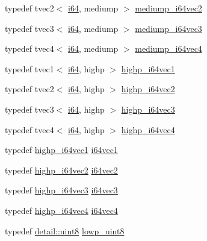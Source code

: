 \begin{DoxyCompactItemize}
\item 
typedef tvec2$<$ \hyperlink{group__gtc__type__precision_gac7a7eaad46064fc952b06df33689da23}{i64}, mediump $>$ \hyperlink{namespaceglm_ac9b4b83ee34df1f21f6dbfc5746e8177}{mediump\+\_\+i64vec2}
\item 
typedef tvec3$<$ \hyperlink{group__gtc__type__precision_gac7a7eaad46064fc952b06df33689da23}{i64}, mediump $>$ \hyperlink{namespaceglm_a19680633964fb57e619bdf1d01b21115}{mediump\+\_\+i64vec3}
\item 
typedef tvec4$<$ \hyperlink{group__gtc__type__precision_gac7a7eaad46064fc952b06df33689da23}{i64}, mediump $>$ \hyperlink{namespaceglm_acb96f56ac9a42f39ca90209cfd557a26}{mediump\+\_\+i64vec4}
\item 
typedef tvec1$<$ \hyperlink{group__gtc__type__precision_gac7a7eaad46064fc952b06df33689da23}{i64}, highp $>$ \hyperlink{namespaceglm_a2fefd6da904e77486fc57d4596eee3f4}{highp\+\_\+i64vec1}
\item 
typedef tvec2$<$ \hyperlink{group__gtc__type__precision_gac7a7eaad46064fc952b06df33689da23}{i64}, highp $>$ \hyperlink{namespaceglm_a8b9347c378dc3f977fdd0c3ea995b7ad}{highp\+\_\+i64vec2}
\item 
typedef tvec3$<$ \hyperlink{group__gtc__type__precision_gac7a7eaad46064fc952b06df33689da23}{i64}, highp $>$ \hyperlink{namespaceglm_a9e2742492829f9a189289ffd79de1183}{highp\+\_\+i64vec3}
\item 
typedef tvec4$<$ \hyperlink{group__gtc__type__precision_gac7a7eaad46064fc952b06df33689da23}{i64}, highp $>$ \hyperlink{namespaceglm_af27ae242d933e3e3f0fd99a73ae09bdb}{highp\+\_\+i64vec4}
\item 
typedef \hyperlink{namespaceglm_a2fefd6da904e77486fc57d4596eee3f4}{highp\+\_\+i64vec1} \hyperlink{group__gtc__type__precision_ga7ee2c91a98ebd719ae26e15ad89106de}{i64vec1}
\item 
typedef \hyperlink{namespaceglm_a8b9347c378dc3f977fdd0c3ea995b7ad}{highp\+\_\+i64vec2} \hyperlink{group__gtc__type__precision_ga5a03cb457be28a9a8b9e61163fe648a1}{i64vec2}
\item 
typedef \hyperlink{namespaceglm_a9e2742492829f9a189289ffd79de1183}{highp\+\_\+i64vec3} \hyperlink{group__gtc__type__precision_ga189eb8d6a197bc491cabb6e1f120ecf4}{i64vec3}
\item 
typedef \hyperlink{namespaceglm_af27ae242d933e3e3f0fd99a73ae09bdb}{highp\+\_\+i64vec4} \hyperlink{group__gtc__type__precision_gade5e969a6155752095d2cd603bda9408}{i64vec4}
\item 
typedef \hyperlink{stb__image_8c_adde6aaee8457bee49c2a92621fe22b79}{detail\+::uint8} \hyperlink{group__gtc__type__precision_ga4d9dc08b7b248a386dfe9afd00fc6b1e}{lowp\+\_\+uint8}

\end{DoxyCompactItemize}
